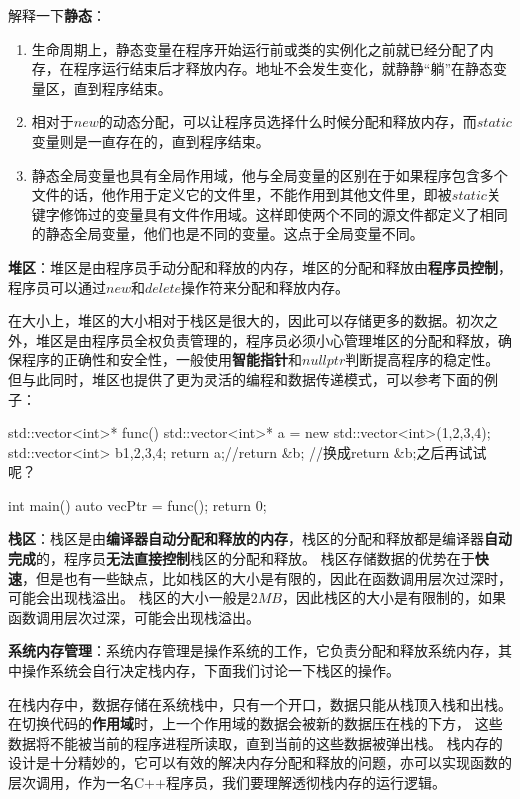 解释一下\textbf{静态}：
\begin{enumerate}
    \item 生命周期上，静态变量在程序开始运行前或类的实例化之前就已经分配了内存，在程序运行结束后才释放内存。地址不会发生变化，就静静“躺”在静态变量区，直到程序结束。
    \item 相对于$new$的动态分配，可以让程序员选择什么时候分配和释放内存，而$static$变量则是一直存在的，直到程序结束。
    \item 静态全局变量也具有全局作用域，他与全局变量的区别在于如果程序包含多个文件的话，他作用于定义它的文件里，不能作用到其他文件里，即被$static$关键字修饰过的变量具有文件作用域。这样即使两个不同的源文件都定义了相同的静态全局变量，他们也是不同的变量。这点于全局变量不同。
\end{enumerate}

\textbf{堆区}：堆区是由程序员手动分配和释放的内存，堆区的分配和释放由\textbf{程序员控制}，程序员可以通过$new$和$delete$操作符来分配和释放内存。

在大小上，堆区的大小相对于栈区是很大的，因此可以存储更多的数据。初次之外，堆区是由程序员全权负责管理的，程序员必须小心管理堆区的分配和释放，确保程序的正确性和安全性，一般使用\textbf{智能指针}和$nullptr$判断提高程序的稳定性。
但与此同时，堆区也提供了更为灵活的编程和数据传递模式，可以参考下面的例子：
\begin{tcode}
std::vector<int>* func(){
    std::vector<int>* a = new std::vector<int>({1,2,3,4});
    std::vector<int> b{1,2,3,4};
    return a;//return &b;
    //换成return &b;之后再试试呢？
}

int main() {
    auto vecPtr = func();
    return 0;
}
\end{tcode}

\textbf{栈区}：栈区是由\textbf{编译器自动分配和释放的内存}，栈区的分配和释放都是编译器\textbf{自动完成}的，程序员\textbf{无法直接控制}栈区的分配和释放。
栈区存储数据的优势在于\textbf{快速}，但是也有一些缺点，比如栈区的大小是有限的，因此在函数调用层次过深时，可能会出现栈溢出。
栈区的大小一般是$2MB$，因此栈区的大小是有限制的，如果函数调用层次过深，可能会出现栈溢出。

\textbf{系统内存管理}：系统内存管理是操作系统的工作，它负责分配和释放系统内存，其中操作系统会自行决定栈内存，下面我们讨论一下栈区的操作。

在栈内存中，数据存储在系统栈中，只有一个开口，数据只能从栈顶入栈和出栈。在切换代码的\textbf{作用域}时，上一个作用域的数据会被新的数据压在栈的下方，
这些数据将不能被当前的程序进程所读取，直到当前的这些数据被弹出栈。
栈内存的设计是十分精妙的，它可以有效的解决内存分配和释放的问题，亦可以实现函数的层次调用，作为一名C++程序员，我们要理解透彻栈内存的运行逻辑。

